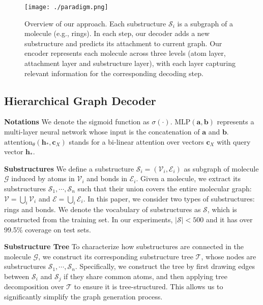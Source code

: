 \documentclass{article} \usepackage{iclr2020_conference,times}
\newcommand{\tree}{\mathcal{T}}
\newcommand{\graph}{\mathcal{G}}
\newcommand{\MLP}{\mathrm{MLP}}
\newcommand{\attention}{\mathrm{attention}}
\def\va{{\bm{a}}}
\def\vb{{\bm{b}}}
\def\vc{{\bm{c}}}
\def\vh{{\bm{h}}}
\def\gE{{\mathcal{E}}}
\def\gS{{\mathcal{S}}}
\def\gV{{\mathcal{V}}}
\newcommand{\sigmoid}{\sigma}
\begin{document}
\begin{figure}[t]
    \centering
    \texttt{[image: ./paradigm.png]}
    \caption{Overview of our approach. Each substructure $\gS_i$ is a subgraph of a molecule (e.g., rings). In each step, our decoder adds a new substructure and predicts its attachment to current graph. Our encoder represents each molecule across three levels (atom layer, attachment layer and substructure layer), with each layer capturing relevant information for the corresponding decoding step.}
    \label{fig:paradigm}
\end{figure}

\subsection{Hierarchical Graph Decoder}
\label{sec:decoder}

\textbf{Notations } We denote the sigmoid function as $\sigmoid(\cdot)$. $\MLP(\va, \vb)$ represents a multi-layer neural network whose input is the concatenation of $\va$ and $\vb$. $\attention_\theta(\vh_*, \vc_X)$ stands for a bi-linear attention over vectors $\vc_X$ with query vector $\vh_*$. 

\textbf{Substructures } 
We define a substructure $\gS_i=(\gV_i,\gE_i)$ as subgraph of molecule $\graph$ induced by atoms in $\gV_i$ and bonds in $\gE_i$. Given a molecule, we extract its substructures $\gS_1,\cdots,\gS_n$ such that their union covers the entire molecular graph: $\gV = \bigcup_i \gV_i$ and $\gE = \bigcup_i \gE_i$. In this paper, we consider two types of substructures: rings and bonds. We denote the vocabulary of substructures as $\gS$, which is constructed from the training set. In our experiments, $|\gS|<500$ and it has over 99.5\% coverage on test sets.

\textbf{Substructure Tree }
To characterize how substructures are connected in the molecule $\graph$, we construct its corresponding substructure tree $\tree$, whose nodes are substructures $\gS_1,\cdots,\gS_n$. Specifically, we construct the tree by first drawing edges between $\gS_i$ and $\gS_j$ if they share common atoms, and then applying tree decomposition over $\tree$ to ensure it is tree-structured. This allows us to significantly simplify the graph generation process.
\end{document}

